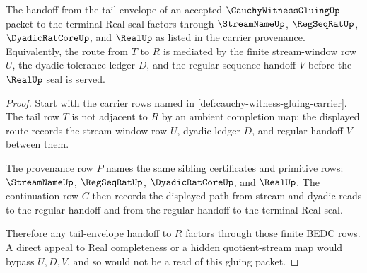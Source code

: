\begin{theorem}
\label{thm:cauchy-witness-gluing-tail-envelope-handoff}
The handoff from the tail envelope of an accepted $\CauchyWitnessGluingUp$ packet to the terminal Real seal factors through $\StreamNameUp$, $\RegSeqRatUp$, $\DyadicRatCoreUp$, and $\RealUp$ as listed in the carrier provenance. Equivalently, the route from $T$ to $R$ is mediated by the finite stream-window row $U$, the dyadic tolerance ledger $D$, and the regular-sequence handoff $V$ before the $\RealUp$ seal is served.
\end{theorem}
\begin{proof}
Start with the carrier rows named in \autoref{def:cauchy-witness-gluing-carrier}. The tail row $T$ is not adjacent to $R$ by an ambient completion map; the displayed route records the stream window row $U$, dyadic ledger $D$, and regular handoff $V$ between them.

The provenance row $P$ names the same sibling certificates and primitive rows: $\StreamNameUp$, $\RegSeqRatUp$, $\DyadicRatCoreUp$, and $\RealUp$. The continuation row $C$ then records the displayed path from stream and dyadic reads to the regular handoff and from the regular handoff to the terminal Real seal.

Therefore any tail-envelope handoff to $R$ factors through those finite BEDC rows. A direct appeal to Real completeness or a hidden quotient-stream map would bypass $U,D,V$, and so would not be a read of this gluing packet.
\end{proof}

